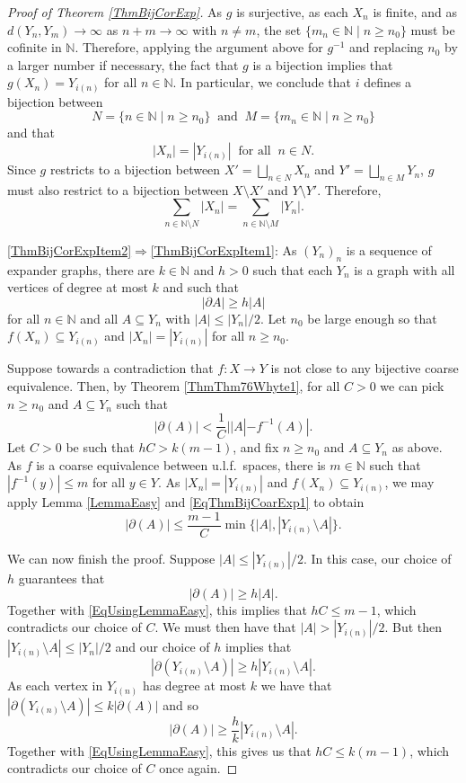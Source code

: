 \documentclass[11pt]{amsart}
\newcommand{\N}{\mathbb{N}}
\numberwithin{equation}{section}
\theoremstyle{definition}
\theoremstyle{remark}
\newcommand{\ri}{\partial}
\numberwithin{equation}{section}
\begin{document}
\begin{proof}[Proof of Theorem \ref{ThmBijCorExp}]
As $g$ is surjective, as each $X_n$ is finite, and as $d(Y_n,Y_m)\to \infty$ as $n+m\to \infty $ with $n\neq m$, the set $\{m_n\in\N\mid n\geq n_0\}$ must be cofinite in $\N$. Therefore, applying the argument above for $g^{-1}$ and replacing $n_0$ by a larger number if necessary, the fact that $g$ is a bijection implies that $g(X_n)=Y_{i(n)}$ for all $n\in\N$. In particular, we conclude that $i$ defines a bijection between
\[
N=\{n\in\N\mid n\geq n_0\}\ \text{ and }\ M=\{m_n\in\N\mid n\geq n_0\}
\]
and that 
\[
|X_n|=|Y_{i(n)}| \ \text{ for all }\ n\in N.
\]
Since $g$ restricts to a bijection between $X'=\bigsqcup_{n\in N}X_n$ and $Y'=\bigsqcup_{n\in M}Y_n$, $g$ must also restrict to a bijection between $X\setminus X'$ and $Y\setminus Y'$. Therefore,
\[
\sum_{n\in \N\setminus N}|X_n|=\sum_{n\in \N\setminus M}|Y_n|.
\]

\eqref{ThmBijCorExpItem2}$\Rightarrow$\eqref{ThmBijCorExpItem1}: As $(Y_n)_n$ is a sequence of expander graphs, there are $k\in\N$ and $h>0$ such that each $Y_n$ is a graph with all vertices of degree at most $k$ and such that
\[
|\partial A|\geq h|A|
\]
for all $n\in\N$ and all $A\subseteq Y_n$ with $|A|\leq |Y_n|/2$. Let $n_0$ be large enough so that $f(X_n)\subseteq Y_{i(n)}$ and $|X_n|=|Y_{i(n)}|$ for all $n\geq n_0$.

Suppose towards a contradiction that $f\colon X\to Y$ is not close to any bijective coarse equivalence. Then, by Theorem \ref{ThmThm76Whyte1}, for all $C>0$ we can pick $n\geq n_0$ and $A\subseteq Y_n$ such that 
\begin{equation}\label{EqThmBijCoarExp1}
|\ri(A)|< \frac{1}{C}||A|-f^{-1}(A)|.
\end{equation}
Let $C>0$ be such that $hC>k(m-1)$, and fix $n\geq n_0$ and $A\subseteq Y_n$ as above. As $f$ is a coarse equivalence between u.l.f.\ spaces, there is $m\in \N$ such that $|f^{-1}(y)|\leq m$ for all $y\in Y$. As $|X_n|=|Y_{i(n)}|$ and $f(X_n)\subseteq Y_{i(n)}$, we may apply Lemma \ref{LemmaEasy} and \eqref{EqThmBijCoarExp1} to obtain 
\begin{equation}\label{EqUsingLemmaEasy}
|\ri( A)|\leq \frac{m-1}{C}\min\{|A|,|Y_{i(n)}\setminus A|\}.
\end{equation}

We can now finish the proof. Suppose $|A|\leq |Y_{i(n)}|/2$. In this case, our choice of $h$ guarantees that \[|\ri( A)|\geq h|A|.\] Together with \eqref{EqUsingLemmaEasy}, this implies that $hC\leq m-1$, which contradicts our choice of $C$. We must then have that $|A|>|Y_{i(n)}|/2$. But then $|Y_{i(n)}\setminus A|\leq |Y_n|/2$ and our choice of $h$ implies that 
\[
|\partial (Y_{i(n)}\setminus A)|\geq h|Y_{i(n)}\setminus A|.
\] 
As each vertex in $Y_{i(n)}$ has degree at most $k$ we have that $|\partial (Y_{i(n)}\setminus A)|\leq k|\partial(A)|$ and so 
\[
|\partial (A)|\geq \frac{h}{k}|Y_{i(n)}\setminus A|.
\]
Together with \eqref{EqUsingLemmaEasy}, this gives us that $hC\leq k(m-1)$, which contradicts our choice of $C$ once again. \fi
\end{proof}
\end{document}
